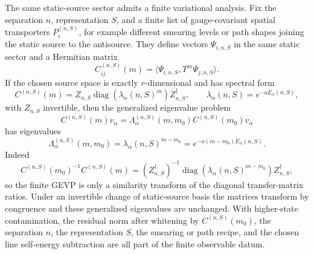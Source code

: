 The same static-source sector admits a finite variational analysis.  Fix the
separation \(n\), representation \(S\), and a finite list of gauge-covariant
spatial transporters \(P_i^{(n,S)}\), for example different smearing levels or
path shapes joining the static source to the antisource.  They define vectors
\(\Psi_{i,n,S}\) in the same static sector and a Hermitian matrix
\begin{equation}
  C_{ij}^{(n,S)}(m)
  =
  \langle \Psi_{i,n,S},T^m\Psi_{j,n,S}\rangle .
  \label{eq:static-source-correlator-matrix}
\end{equation}
If the chosen source space is exactly \(r\)-dimensional and has spectral form
\begin{equation}
  C^{(n,S)}(m)
  =
  Z_{n,S}\operatorname{diag}(\lambda_\alpha(n,S)^m)Z_{n,S}^{\dagger},
  \qquad
  \lambda_\alpha(n,S)=e^{-aE_\alpha(n,S)},
  \label{eq:static-source-exact-matrix-spectrum}
\end{equation}
with \(Z_{n,S}\) invertible, then the generalized eigenvalue problem
\begin{equation}
  C^{(n,S)}(m)v_\alpha
  =
  \Lambda_\alpha^{(n,S)}(m,m_0)C^{(n,S)}(m_0)v_\alpha
  \label{eq:static-source-gevp}
\end{equation}
has eigenvalues
\begin{equation}
  \Lambda_\alpha^{(n,S)}(m,m_0)
  =
  \lambda_\alpha(n,S)^{m-m_0}
  =
  e^{-a(m-m_0)E_\alpha(n,S)} .
  \label{eq:static-source-gevp-eigenvalues}
\end{equation}
Indeed
\[
  C^{(n,S)}(m_0)^{-1}C^{(n,S)}(m)
  =
  (Z_{n,S}^{\dagger})^{-1}
  \operatorname{diag}(\lambda_\alpha(n,S)^{m-m_0})
  Z_{n,S}^{\dagger},
\]
so the finite GEVP is only a similarity transform of the diagonal
transfer-matrix ratios.  Under an invertible change of static-source basis the
matrices transform by congruence and these generalized eigenvalues are
unchanged.  With higher-state contamination, the residual norm after whitening
by \(C^{(n,S)}(m_0)\), the separation \(n\), the representation \(S\), the
smearing or path recipe, and the chosen line self-energy subtraction are all
part of the finite observable datum.

